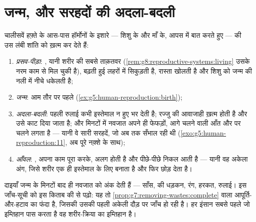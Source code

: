 \section{जन्म, और सरहदों की अदला-बदली}

\begin{proposition}\label{prop:g8:from-egg-to-birth:birth}
चालीसवें हफ़्ते के आस-पास हॉर्मोनों के इशारे --- शिशु के और माँ के,
आपस में बात करते हुए ---  की उस लंबी शांति को ख़त्म कर देते हैं:
\begin{enumerate}
  \item \emph{प्रसव-पीड़ा}: , यानी शरीर की सबसे ताक़तवर 
        (\cref{rem:g8:reproductive-systems:living} उसके नरम काम से
        मिल चुकी है), बढ़ती हुई लहरों में सिकुड़ती है, रास्ता खोलती है
        और शिशु को जन्म की नली में नीचे धकेलती है;
  \item \emph{जन्म}: आम तौर पर  पहले
        (\cref{ex:g5:human-reproduction:birth});
  \item \emph{अदला-बदली}: पहली रुलाई कभी इस्तेमाल न हुए  भर देती
        है; रज्जु की आवाजाही ख़त्म होती है और उसे काट दिया जाता है; और
        मिनटों में नवजात अपने ही फेफड़ों, आगे चलने वाली आँत और 
        पर चलने लगता है --- यानी वे सारी सरहदें, जो अब तक  सँभाल
        रही थी (\cref{exo:g5:human-reproduction:11}, अब पूरे नक़्शे के
        साथ);
  \item \emph{आँवल}: , अपना काम पूरा करके, अलग होती है और
        पीछे-पीछे निकल आती है --- यानी वह अकेला अंग, जिसे शरीर एक ही
        इस्तेमाल के लिए बनाता है और फिर छोड़ देता है।
\end{enumerate}
\end{proposition}
\admitted

\begin{example}\label{ex:g8:from-egg-to-birth:audit}
दाइयाँ जन्म के मिनटों बाद ही नवजात को अंक देती हैं --- साँस,  की
धड़कन, रंग, हरकत, रुलाई। इस जाँच-सूची को इस किताब की  से पढ़ो: यह
तो \cref{prop:g7:removing-wastes:complete} वाला आपूर्ति-और-हटाव का
फंदा है, जिसकी उसकी पहली अकेली दौड़ पर जाँच हो रही है। हर इंसान सबसे
पहले जो इम्तिहान पास करता है वह शरीर-क्रिया का इम्तिहान है।
\end{example}

